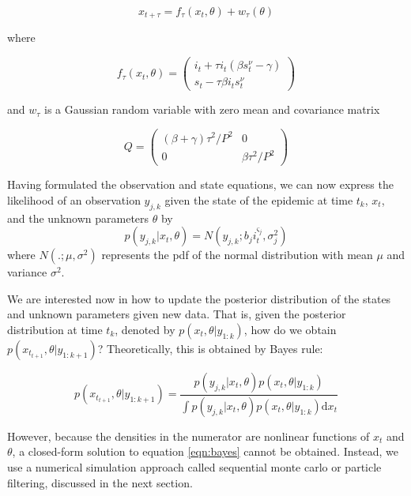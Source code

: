 \documentclass{article}
\begin{document}
\begin{equation}
x_{t+\tau} = f_\tau(x_t,\theta) + w_{\tau}(\theta) \label{eqn:state}
\end{equation}

\noindent where

\begin{equation}
f_\tau(x_t,\theta) = \left(
\begin{array}{c}
i_t + \tau i_t(\beta s^{\nu}_t - \gamma) \\
s_t - \tau\beta i_ts^{\nu}_t
\end{array}
\right) \label{eqn:f}
\end{equation}

\noindent and $w_\tau$ is a Gaussian random variable with zero mean and covariance matrix

\begin{equation}
Q = \left(
\begin{array}{ccccc}
(\beta + \gamma)\tau^2/P^2 & 0 \\
0 & \beta\tau^2/P^2
\end{array}
\right) \label{eqn:q}
\end{equation}

\noindent Having formulated the observation and state equations, we can now express the likelihood of an observation $y_{j,k}$ given the state of the epidemic at time $t_k$, $x_t$, and the unknown parameters $\theta$ by \[p(y_{j,k}|x_t,\theta) = N(y_{j,k};b_ji^{\varsigma_j}_t,\sigma^2_j)\] where $N(.;\mu,\sigma^2)$ represents the pdf of the normal distribution with mean $\mu$ and variance $\sigma^2$.

We are interested now in how to update the posterior distribution of the states and unknown parameters given new data.  That is, given the posterior distribution at time $t_k$, denoted by $p(x_t,\theta|y_{1:k})$, how do we obtain $p(x_{t_{t+1}},\theta|y_{1:k+1})$?  Theoretically, this is obtained by Bayes rule:

\begin{equation}
p(x_{t_{t+1}},\theta|y_{1:k+1}) = \frac{p(y_{j,k}|x_t,\theta)p(x_t,\theta|y_{1:k})}{\int p(y_{j,k}|x_t,\theta)p(x_t,\theta|y_{1:k}) \mathrm{d} x_t} \label{eqn:bayes}
\end{equation}

\noindent However, because the densities in the numerator are nonlinear functions of $x_t$ and $\theta$, a closed-form solution to equation \eqref{eqn:bayes} cannot be obtained.  Instead, we use a numerical simulation approach called sequential monte carlo or particle filtering, discussed in the next section.
\end{document}
